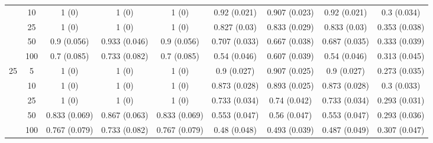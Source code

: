 \documentclass[10pt]{article}
\theoremstyle{definition}
\begin{document}
\begin{sidewaysfigure}
\begin{tabular}{cc|ccc|cccc}
    & 10  & 1 (0) & 1 (0) & 1 (0) & 0.92 (0.021) & 0.907 (0.023) & 0.92 (0.021) & 0.3 (0.034) \\ 
   & 25  & 1 (0) & 1 (0) & 1 (0) & 0.827 (0.03) & 0.833 (0.029) & 0.833 (0.03) & 0.353 (0.038) \\ 
  & 50  & 0.9 (0.056) & 0.933 (0.046) & 0.9 (0.056) & 0.707 (0.033) & 0.667 (0.038) & 0.687 (0.035) & 0.333 (0.039) \\ 
    & 100  & 0.7 (0.085) & 0.733 (0.082) & 0.7 (0.085) & 0.54 (0.046) & 0.607 (0.039) & 0.54 (0.046) & 0.313 (0.045) \\[.3cm] 
   \multirow{5}{*}{25} & 5  & 1 (0) & 1 (0) & 1 (0) & 0.9 (0.027) & 0.907 (0.025) & 0.9 (0.027) & 0.273 (0.035) \\ 
    & 10  & 1 (0) & 1 (0) & 1 (0) & 0.873 (0.028) & 0.893 (0.025) & 0.873 (0.028) & 0.3 (0.033) \\ 
    & 25  & 1 (0) & 1 (0) & 1 (0) & 0.733 (0.034) & 0.74 (0.042) & 0.733 (0.034) & 0.293 (0.031) \\ 
    & 50  & 0.833 (0.069) & 0.867 (0.063) & 0.833 (0.069) & 0.553 (0.047) & 0.56 (0.047) & 0.553 (0.047) & 0.293 (0.036) \\ 
    & 100  & 0.767 (0.079) & 0.733 (0.082) & 0.767 (0.079) & 0.48 (0.048) & 0.493 (0.039) & 0.487 (0.049) & 0.307 (0.047) \\ 
\end{tabular}
\end{sidewaysfigure}
\end{document}
